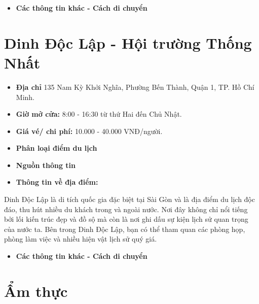 \documentclass{article}
\begin{document}
\begin{itemize}
    \item{\textbf{Các thông tin khác - Cách di chuyển}}
\end{itemize}

\section{Dinh Độc Lập - Hội trường Thống Nhất}
\begin{itemize}
    \item{\textbf{Địa chỉ}} 135 Nam Kỳ Khởi Nghĩa, Phường Bến Thành, Quận 1, TP. Hồ Chí Minh.
    \item{\textbf{Giờ mở cửa:}} 8:00 - 16:30 từ thứ Hai đến Chủ Nhật.
    \item{\textbf{Giá vé/ chi phí:}} 10.000 - 40.000 VNĐ/người.
    \item{\textbf{Phân loại điểm du lịch} }
    \item{\textbf{Nguồn thông tin}}
    \item{\textbf{Thông tin về địa điểm:}}
\end{itemize}
Dinh Độc Lập là di tích quốc gia đặc biệt tại Sài Gòn và là địa điểm du lịch độc đáo, thu hút nhiều du khách trong và ngoài nước. Nơi đây không chỉ nổi tiếng bởi lối kiến trúc đẹp và đồ sộ mà còn là nơi ghi dấu sự kiện lịch sử quan trọng của nước ta. Bên trong Dinh Độc Lập, bạn có thể tham quan các phòng họp, phòng làm việc và nhiều hiện vật lịch sử quý giá.

\begin{itemize}
    \item{\textbf{Các thông tin khác - Cách di chuyển}}
\end{itemize}




\newpage
\section*{{Ẩm thực}}
\end{document}
